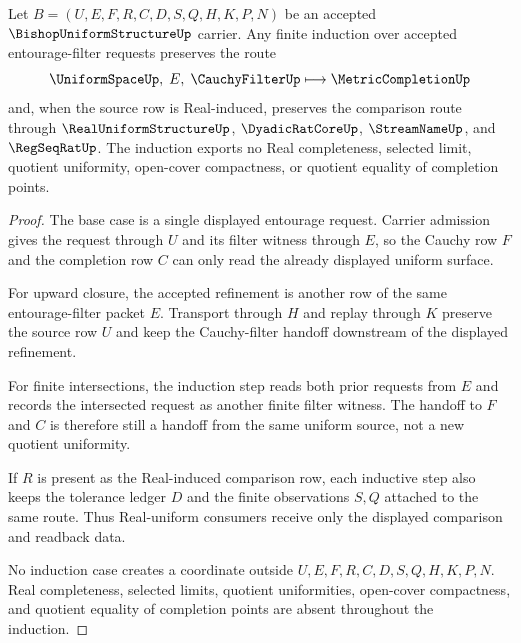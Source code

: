 \begin{theorem}
\label{thm:bishop-uniform-structure-filter-entourage-induction}
Let $B=(U,E,F,R,C,D,S,Q,H,K,P,N)$ be an accepted $\BishopUniformStructureUp$ carrier. Any finite induction over accepted entourage-filter requests preserves the route
$$
\UniformSpaceUp,\;E,\;\CauchyFilterUp
\longmapsto
\MetricCompletionUp
$$
and, when the source row is Real-induced, preserves the comparison route through $\RealUniformStructureUp$, $\DyadicRatCoreUp$, $\StreamNameUp$, and $\RegSeqRatUp$. The induction exports no Real completeness, selected limit, quotient uniformity, open-cover compactness, or quotient equality of completion points.
\end{theorem}
\begin{proof}
The base case is a single displayed entourage request. Carrier admission gives the request through $U$ and its filter witness through $E$, so the Cauchy row $F$ and the completion row $C$ can only read the already displayed uniform surface.

For upward closure, the accepted refinement is another row of the same entourage-filter packet $E$. Transport through $H$ and replay through $K$ preserve the source row $U$ and keep the Cauchy-filter handoff downstream of the displayed refinement.

For finite intersections, the induction step reads both prior requests from $E$ and records the intersected request as another finite filter witness. The handoff to $F$ and $C$ is therefore still a handoff from the same uniform source, not a new quotient uniformity.

If $R$ is present as the Real-induced comparison row, each inductive step also keeps the tolerance ledger $D$ and the finite observations $S,Q$ attached to the same route. Thus Real-uniform consumers receive only the displayed comparison and readback data.

No induction case creates a coordinate outside $U,E,F,R,C,D,S,Q,H,K,P,N$. Real completeness, selected limits, quotient uniformities, open-cover compactness, and quotient equality of completion points are absent throughout the induction.
\end{proof}


